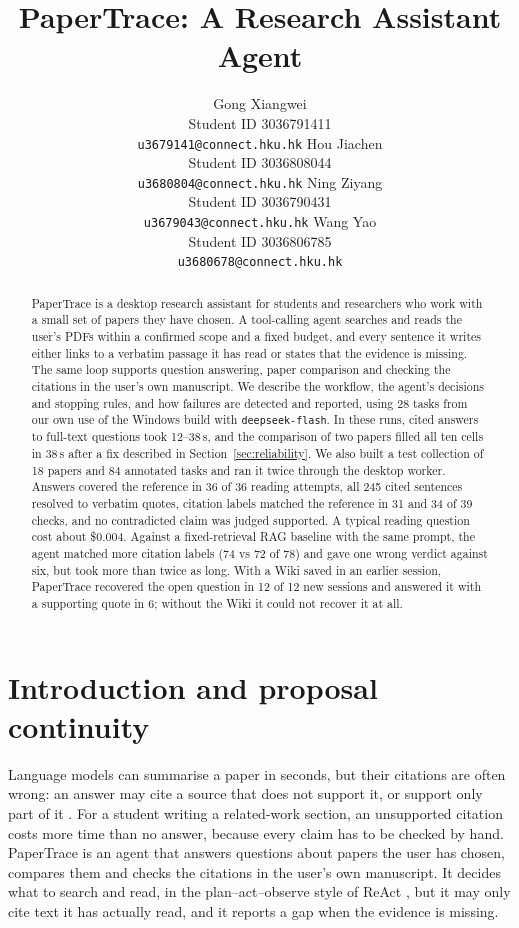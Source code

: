 \documentclass{article}
\title{PaperTrace: A Research Assistant Agent}
\author{
  Gong Xiangwei\\
  Student ID 3036791411\\
  \texttt{u3679141@connect.hku.hk}
  \And
  Hou Jiachen\\
  Student ID 3036808044\\
  \texttt{u3680804@connect.hku.hk}
  \AND
  Ning Ziyang\\
  Student ID 3036790431\\
  \texttt{u3679043@connect.hku.hk}
  \And
  Wang Yao\\
  Student ID 3036806785\\
  \texttt{u3680678@connect.hku.hk}
}
\begin{document}
\maketitle
\nolinenumbers

\begin{abstract}
PaperTrace is a desktop research assistant for students and researchers who work with a small set of
papers they have chosen. A tool-calling agent searches and reads the user's PDFs within a confirmed
scope and a fixed budget, and every sentence it writes either links to a verbatim passage it has read
or states that the evidence is missing. The same loop supports question answering, paper comparison
and checking the citations in the user's own manuscript. We describe the workflow, the agent's
decisions and stopping rules, and how failures are detected and reported, using 28 tasks from our own
use of the Windows build with \texttt{deepseek-flash}. In these runs, cited answers to full-text
questions took 12--38\,s, and the comparison of two papers filled all ten cells in 38\,s after a fix
described in Section~\ref{sec:reliability}. We also built a test collection of 18 papers and 84
annotated tasks and ran it twice through the desktop worker. Answers covered the reference in 36 of
36 reading attempts, all 245 cited sentences resolved to verbatim quotes, citation labels matched the
reference in 31 and 34 of 39 checks, and no contradicted claim was judged supported. A typical
reading question cost about \$0.004. Against a fixed-retrieval RAG baseline with the same prompt, the
agent matched more citation labels (74 vs 72 of 78) and gave one wrong verdict against six, but took
more than twice as long. With a Wiki saved in an earlier session,
PaperTrace recovered the open question in 12 of 12 new sessions and answered it with a supporting
quote in 6; without the Wiki it could not recover it at all.
\end{abstract}

\section{Introduction and proposal continuity}
\label{sec:scope}

Language models can summarise a paper in seconds, but their citations are often wrong: an answer may
cite a source that does not support it, or support only part of it \citep{alce}. For a student writing
a related-work section, an unsupported citation costs more time than no answer, because every claim
has to be checked by hand. PaperTrace is an agent that answers questions about papers the user has
chosen, compares them and checks the citations in the user's own manuscript. It decides what to
search and read, in the plan--act--observe style of ReAct \citep{react}, but it may only cite text it
has actually read, and it reports a gap when the evidence is missing.
\end{document}
